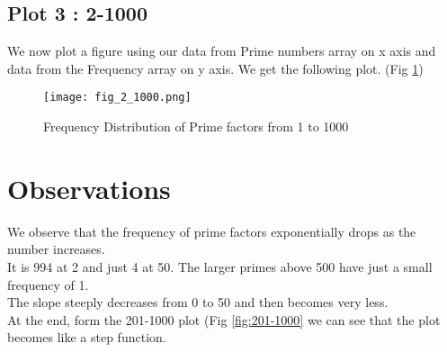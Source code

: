 \documentclass[12pt]{article}
\begin{document}
    \subsection{Plot 3 : 2-1000}
        We now plot a figure using our data from Prime numbers array on x axis and data from the Frequency array on y axis.
        We get the following plot. (Fig \ref{fig:2-1000})
        \begin{figure}[H]
            \centering
            \texttt{[image: fig\_2\_1000.png]}
            \caption{Frequency Distribution of Prime factors from 1 to 1000}
            \label{fig:2-1000}
        \end{figure}
        
\section{Observations}
    We observe that the frequency of prime factors exponentially drops as the number increases.\\ 
    It is 994 at 2 and just 4 at 50. The larger primes above 500 have just a small frequency of 1.\\
    The slope steeply decreases from 0 to 50 and then becomes very less.\\
    At the end, form the 201-1000 plot (Fig \ref{fig:201-1000} we can see that the plot becomes like a step function.

\newpage
\appendix
{}
\end{document}
